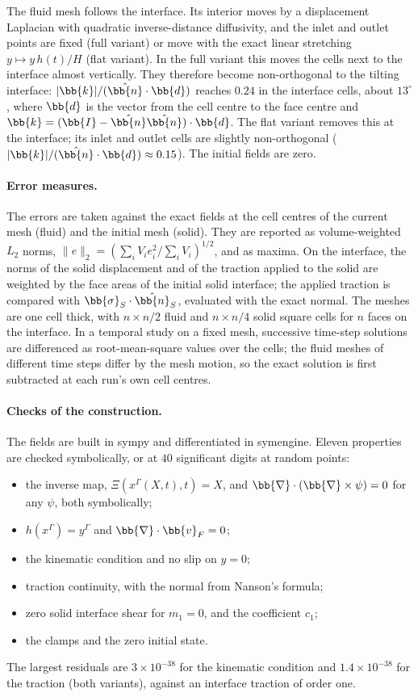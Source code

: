 The fluid mesh follows the interface.
Its interior moves by a displacement Laplacian with quadratic inverse-distance diffusivity, and the inlet and outlet points are fixed (full variant) or move with the exact linear stretching $y \mapsto y\,h(t)/H$ (flat variant).
In the full variant this moves the cells next to the interface almost vertically.
They therefore become non-orthogonal to the tilting interface: $|\bb{k}|/(\hat{\bb{n}}\cdot\bb{d})$ reaches $0.24$ in the interface cells, about $13^\circ$, where $\bb{d}$ is the vector from the cell centre to the face centre and $\bb{k} = (\bb{I} - \hat{\bb{n}}\hat{\bb{n}})\cdot\bb{d}$.
The flat variant removes this at the interface; its inlet and outlet cells are slightly non-orthogonal ($|\bb{k}|/(\hat{\bb{n}}\cdot\bb{d}) \approx 0.15$).
The initial fields are zero.

\paragraph{Error measures.}
The errors are taken against the exact fields at the cell centres of the current mesh (fluid) and the initial mesh (solid).
They are reported as volume-weighted $L_2$ norms, $\|e\|_2 = (\sum_i V_i e_i^2/\sum_i V_i)^{1/2}$, and as maxima.
On the interface, the norms of the solid displacement and of the traction applied to the solid are weighted by the face areas of the initial solid interface; the applied traction is compared with $\bb{\sigma}_S\cdot\hat{\bb{n}}_S$, evaluated with the exact normal.
The meshes are one cell thick, with $n \times n/2$ fluid and $n \times n/4$ solid square cells for $n$ faces on the interface.
In a temporal study on a fixed mesh, successive time-step solutions are differenced as root-mean-square values over the cells; the fluid meshes of different time steps differ by the mesh motion, so the exact solution is first subtracted at each run's own cell centres.

\paragraph{Checks of the construction.}
The fields are built in sympy and differentiated in symengine.
Eleven properties are checked symbolically, or at $40$ significant digits at random points:
\begin{itemize}
  \item the inverse map, $\Xi(x^\Gamma(X,t),t) = X$, and $\bb{\nabla}\cdot(\bb{\nabla}\times\psi) = 0$ for any $\psi$, both symbolically;
  \item $h(x^\Gamma) = y^\Gamma$ and $\bb{\nabla}\cdot\bb{v}_F = 0$;
  \item the kinematic condition and no slip on $y = 0$;
  \item traction continuity, with the normal from Nanson's formula;
  \item zero solid interface shear for $m_1 = 0$, and the coefficient $c_1$;
  \item the clamps and the zero initial state.
\end{itemize}
The largest residuals are $3\times10^{-38}$ for the kinematic condition and $1.4\times10^{-38}$ for the traction (both variants), against an interface traction of order one.

